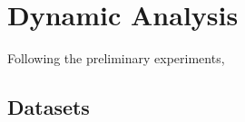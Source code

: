 
\chapter{Dynamic Analysis}
\label{cap:dynamic}

Following the preliminary experiments,

\section{Datasets}
\label{sec:datasets04}
